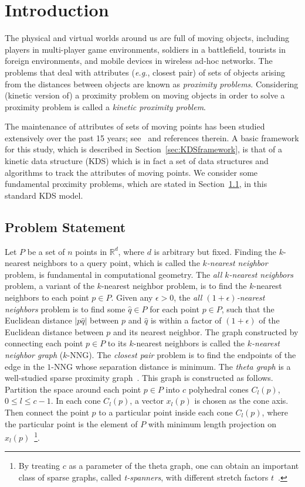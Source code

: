 \documentclass[preprint,12pt]{elsarticle}
\def\knng{\mbox{$k$-NNG}}
\newcommand{\eg}{\emph{e.g.}}
\begin{document}
\section{Introduction}
The physical and virtual worlds around us are full of moving objects, including players in multi-player game environments, soldiers in a battlefield, tourists in foreign environments, and mobile devices in wireless ad-hoc networks. The problems that deal with attributes  (\eg, closest pair) of sets of objects arising from the distances between objects are known as \textit{proximity problems}.  Considering (kinetic version of) a proximity problem on moving objects in order to solve a proximity problem is called a \textit{kinetic proximity problem}.

The maintenance of attributes of sets of moving points has been studied extensively over the past 15 years; see~\cite{rahmati2014simple} and references therein. A basic framework for this study, which is described in Section~\ref{sec:KDSframework}, is that of a kinetic data structure (KDS) which is in fact a set of data structures and algorithms to track the attributes of moving points. We consider some  fundamental proximity problems, which are stated in Section~\ref{sec:ProbStatment}, in this standard KDS model.

\subsection{Problem Statement}\label{sec:ProbStatment}
Let $P$ be a set of $n$ points in $\mathbb{R}^d$, where $d$ is arbitrary but fixed. Finding the $k$-nearest neighbors to a query point, which is called the \textit{$k$-nearest neighbor} problem, is fundamental in computational geometry. The \textit{all $k$-nearest neighbors} problem, a variant of the $k$-nearest neighbor problem, is to find the $k$-nearest neighbors to each point $p\in P$. Given any $\epsilon>0$, the \textit{all $(1+\epsilon)$-nearest neighbors} problem is to find some $\hat{q}\in P$ for each point $p\in P$, such that the Euclidean distance $|p\hat{q}|$ between $p$ and $\hat{q}$ is within a factor of $(1+\epsilon)$ of the Euclidean distance between $p$ and its nearest neighbor. The graph constructed by connecting each point $p\in P$ to its $k$-nearest neighbors is called the \textit{$k$-nearest neighbor graph} (\knng). The \textit{closest pair} problem is to find the endpoints of the edge in the $1$-NNG whose separation distance is minimum. 
The \textit{theta graph} is a well-studied sparse proximity graph~\cite{Clarkson:1987:AAS:28395.28402,Keil:1988:ACE:61764.61787}. This graph is constructed as follows. Partition the space around each point $p\in P$ into $c$ polyhedral cones $C_l(p)$, $0\leq l \leq c-1$. In each cone $C_l(p)$, a vector $x_l(p)$ is chosen as the cone axis. Then connect the point $p$ to a particular point inside each cone $C_l(p)$, where the particular point is the element of $P$ with minimum length projection on $x_l(p)$~\footnote{By treating $c$ as a parameter of the theta graph, one can obtain an important class of sparse graphs, called \textit{t-spanners}, with different stretch factors $t$~\cite{DBLP:journals/corr/BoseCMRV14}.}.
\end{document}
